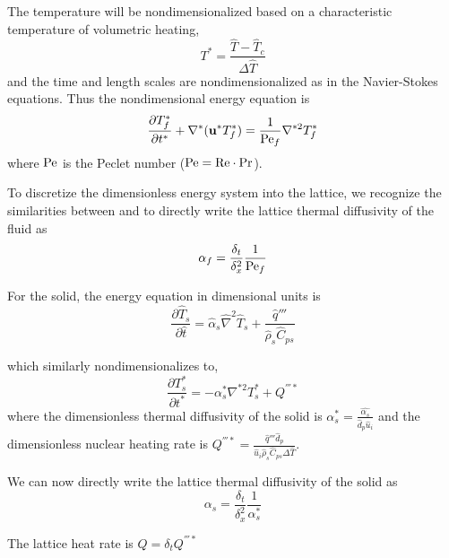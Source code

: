 The temperature will be nondimensionalized based on a characteristic temperature of volumetric heating,
\begin{equation}
	T^* = \frac{\hat{T} - \hat{T}_c}{\Delta \hat{T}}
\end{equation}
and the time and length scales are nondimensionalized as in the Navier-Stokes equations. Thus the nondimensional energy equation is
\begin{equation}\label{eq:non-dim-energy}
	\frac{\partial T^*_f}{\partial t^*} + \nabla^*(\mathbf{u}^*T^*_f) = \frac{1}{\mathrm{Pe}_f} \nabla^{*2}T^*_f
\end{equation}
where $\mathrm{Pe}$ is the Peclet number ($\mathrm{Pe} = \mathrm{Re}\cdot \mathrm{Pr}$).

To discretize the dimensionless energy system into the lattice, we recognize the similarities between  and  to directly write the lattice thermal diffusivity of the fluid as
\begin{equation}\label{eq:fluid-alpha}
	\alpha_f = \frac{\delta_t}{\delta_x^2}\frac{1}{\mathrm{Pe}_f}
\end{equation}

For the solid, the energy equation in dimensional units is
\begin{equation}
	\frac{\partial \hat{T}_s}{\partial \hat{t}} = \hat{\alpha}_s\hat{\nabla}^2\hat{T}_s + \frac{\hat{q}'''}{\hat{\rho}_s\hat{C}_{ps}}
\end{equation}

which similarly nondimensionalizes to,
\begin{equation}\label{eq:non-dim-energy-solid}
	\frac{\partial T^*_s}{\partial t^*} = -\alpha_s^* \nabla^{*2}T^*_s + Q^{'''*}
\end{equation}
where the dimensionless thermal diffusivity of the solid is $\alpha_s^* = \frac{\hat{\alpha_s}}{\hat{d}_p\hat{u}_i}$ and the dimensionless nuclear heating rate is $Q^{'''*} = \frac{\hat{q}'''\hat{d}_p}{\hat{u}_{i}\hat{\rho}_s\hat{C}_{ps}\Delta\hat{T}}$.

We can now directly write the lattice thermal diffusivity of the solid as
\begin{equation}\label{eq:solid-alpha}
	\alpha_s = \frac{\delta_t}{\delta_x^2}\frac{1}{\alpha_s^*}
\end{equation}

The lattice heat rate is $Q = \delta_tQ^{'''*}$

